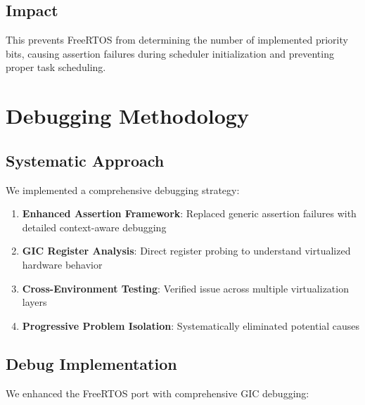 \documentclass[12pt,a4paper]{article}
\begin{document}
\subsection{Impact}

This prevents FreeRTOS from determining the number of implemented priority bits, causing assertion failures during scheduler initialization and preventing proper task scheduling.

\section{Debugging Methodology}

\subsection{Systematic Approach}

We implemented a comprehensive debugging strategy:

\begin{enumerate}
    \item \textbf{Enhanced Assertion Framework}: Replaced generic assertion failures with detailed context-aware debugging
    \item \textbf{GIC Register Analysis}: Direct register probing to understand virtualized hardware behavior
    \item \textbf{Cross-Environment Testing}: Verified issue across multiple virtualization layers
    \item \textbf{Progressive Problem Isolation}: Systematically eliminated potential causes
\end{enumerate}

\subsection{Debug Implementation}

We enhanced the FreeRTOS port with comprehensive GIC debugging:
\end{document}
